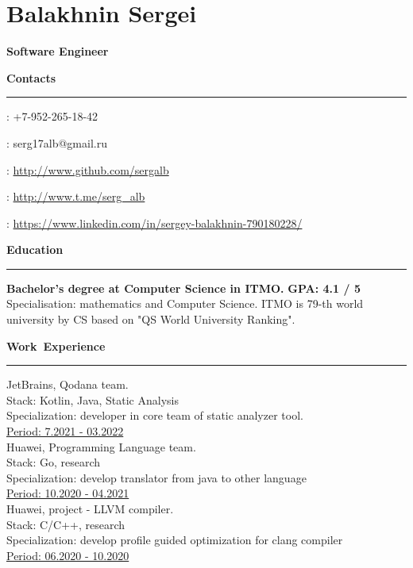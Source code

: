 \documentclass[10pt, a4paper]{report}
\author{Balakhnin Sergei}
\begin{document}
    \section*{Balakhnin Sergei}

    {\large\textbf{Software Engineer}}

    \hbox{\large\textbf{Contacts}}\kern5pt\hrule\kern5pt

    \faPhone: +7-952-265-18-42

    \Letter: serg17alb@gmail.ru

    \faGithub: \url{http://www.github.com/sergalb}

    \faSend: \url{http://www.t.me/serg_alb}
    
    \faLinkedinSquare: \url{https://www.linkedin.com/in/sergey-balakhnin-790180228/}\\



    \par\hbox{\large\textbf{Education}}\kern5pt\hrule\kern5pt

    \textbf{Bachelor's degree at Computer Science in ITMO.}
    \hfill
    \textbf{ GPA: 4.1 / 5} \\
        Specialisation: mathematics and Computer Science. ITMO is 79-th world university by CS based on "QS World University Ranking".\\

    \par\hbox{\large\textbf{Work Experience}}\kern3pt\hrule\kern10pt

    JetBrains, Qodana team. \\
    Stack: Kotlin, Java, Static Analysis \\
    Specialization: developer in core team of static analyzer tool.\\
    \underline{Period: 7.2021 - 03.2022} \\
    
    Huawei, Programming Language team. \\
    Stack: Go, research \\
    Specialization: develop translator from java to other language \\
    \underline{Period: 10.2020 - 04.2021} \\

    Huawei, project - LLVM compiler. \\
    Stack: C/C++, research \\
    Specialization: develop profile guided optimization for clang compiler\\
    \underline{Period: 06.2020 - 10.2020} \\
\end{document}
